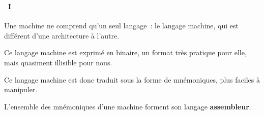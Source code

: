 \begin{frame}
  \frametitle{\secname}
  \framesubtitle{\subsecname~I}
 
  Une machine ne comprend qu'un seul langage~: le langage machine, qui est différent d'une architecture à l'autre.
  \vspace{1cm}
  \par
  Ce langage machine est exprimé en binaire, un format très pratique pour elle, mais quasiment illisible pour nous.
  \vspace{1cm}
  \par
  Ce langage machine est donc traduit sous la forme de mnémoniques, plus faciles à manipuler. 
  \par
  L'ensemble des mnémoniques d'une machine forment son langage \textbf{assembleur}.
\end{frame}

